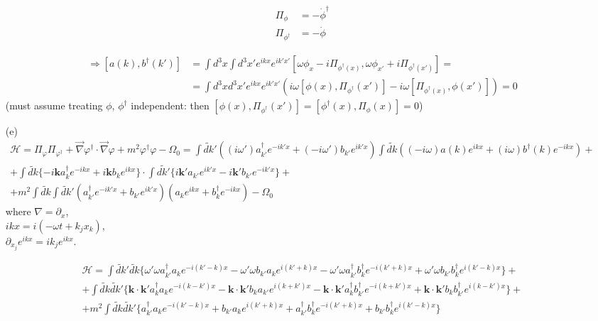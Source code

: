 \documentclass[twoside]{amsart}
\begin{document}
\begin{itemize}
\[
\begin{aligned}
  \Pi_{\phi} & = - \dot{\phi}^{\dag} \\ 
  \Pi_{\phi^{\dag}} & = - \dot{\phi}
\end{aligned}
\]

\[
\begin{aligned}
  \Longrightarrow \left[ a(k), b^{\dag}(k') \right] & = \int d^3x \int d^3x' e^{ikx} e^{ik'x'} [ \omega \phi_x - i \Pi_{\phi^{\dag}(x)} , \omega \phi_{x'} + i \Pi_{\phi^{\dag}(x') } ] = \\
  & = \int d^3x d^3x' e^{ikx} e^{ik'x'} ( i\omega [\phi(x), \Pi_{\phi^{\dag}}(x') ] - i \omega [ \Pi_{\phi^{\dag}(x) }, \phi(x') ] ) = 0 
\end{aligned}
\]
(must assume treating $\phi$, $\phi^{\dag}$ independent: then $[\phi(x), \Pi_{\phi^{\dag} }(x')] = [\phi^{\dag}(x),\Pi_{\phi}(x)] = 0 $)

\item[(e)] 
\[
\begin{gathered}
\mathcal{H}  =  \Pi_{\varphi }\Pi_{\varphi^{\dag}} + \vec{\nabla} \varphi^{\dag} \cdot \vec{\nabla} \varphi + m^2 \varphi^{\dag} \varphi - \Omega_0 =   \int \widetilde{dk}' ((i\omega')a_{k'}^{\dag}  e^{-ik'x} + (-i\omega')b_{k'} e^{ik'x} )\int \widetilde{dk}  ( (-i\omega)a(k)  e^{ikx} + (i\omega)b^{\dag}(k)  e^{-ikx} ) + \\
+ \int \widetilde{dk} \lbrace -i \mathbf{k} a_k^{\dag} e^{-ikx} + i\mathbf{k} b_k e^{ikx} \rbrace \cdot \int \widetilde{dk'} \lbrace i\mathbf{k}' a_{k'} e^{ik'x} - i \mathbf{k}' b_{k'} e^{-ik'x} \rbrace + \\ + m^2 \int \widetilde{dk} \int \widetilde{dk}' (a_{k'}^{\dag} e^{-ik'x} + b_{k'} e^{ik'x} )( a_k e^{ikx} + b_k^{\dag}e^{-ikx} ) - \Omega_0 
\end{gathered}
\]
where $\nabla = \partial_x$, \\
$ikx = i (-\omega t + k_j x_k )$, \\
$\partial_{x_j} e^{ikx} = ik_j e^{ikx}$.  

\[
\begin{gathered}
  \mathcal{H} = \int \widetilde{dk}' \widetilde{dk} \lbrace \omega' \omega a_{k'}^{\dag} a_k e^{-i (k' -k)x } - \omega' \omega b_{k'} a_k e^{i (k' + k)x} - \omega' \omega a_{k'}^{\dag} b_k^{\dag} e^{-i(k'+k) x} + \omega' \omega b_{k'} b_k^{\dag} e^{i(k'-k) x} \rbrace + \\ 
  + \int \widetilde{dk} \widetilde{dk}' \lbrace \mathbf{k} \cdot \mathbf{k}' a_k^{\dag} a_k e^{-i(k -k')x} - \mathbf{k}\cdot \mathbf{k}' b_k a_{k'} e^{i(k+k')x} - \mathbf{k}\cdot \mathbf{k}' a_k^{\dag} b_{k'}^{\dag} e^{-i(k+k')x} + \mathbf{k}\cdot \mathbf{k}' b_k b_{k'}^{\dag} e^{i(k-k')x} \rbrace  + \\
  + m^2 \int \widetilde{dk} \widetilde{dk}' \lbrace a_{k'}^{\dag} a_k e^{-i(k'-k)x} + b_{k'} a_k e^{i (k'+k) x} + a_{k'}^{\dag} b_k^{\dag} e^{-i(k'+k)x} + b_{k'}b_k^{\dag} e^{i(k'-k)x} \rbrace
\end{gathered}
\]


\end{itemize}
\end{document}
